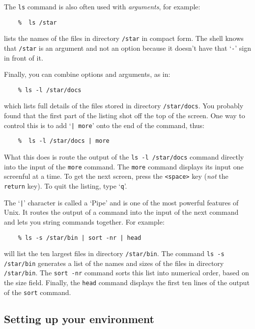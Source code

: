 \documentclass[twoside,11pt]{article}
\begin{document}
The {\tt ls} command is also often used with {\em arguments}, for example:
\begin{verbatim}
    %  ls /star
\end{verbatim}
lists the names of the files in directory {\tt /star} in compact form.
The shell knows that {\tt /star} is an argument and not an option because it
doesn't have that `{\tt -}' sign in front of it.

Finally, you can combine options and arguments, as in:
\begin{verbatim}
    % ls -l /star/docs
\end{verbatim}
which lists full details of the files stored in directory {\tt /star/docs}.
You probably found that the first part of the listing shot off the top of the
screen.
One way to control this is to add `{\tt | more}' onto the end of the command,
thus:
\begin{verbatim}
    %  ls -l /star/docs | more
\end{verbatim}
What this does is route the output of the {\tt ls -l /star/docs} command
directly into the input of the {\tt more} command.
The {\tt more} command displays its input one screenful at a time.
To get the next screen, press the {\tt <space>} key ({\em not}\/ the
{\tt return} key).
To quit the listing, type `{\tt q}'.

The `{\tt |}' character is called a `Pipe' and is one of the most powerful
features of Unix.
It routes the output of a command into the input of the next command and lets
you string commands together.
For example:
\begin{verbatim}
    % ls -s /star/bin | sort -nr | head
\end{verbatim}
will list the ten largest files in directory {\tt /star/bin}.
The command {\tt ls -s /star/bin} generates a list of the names and sizes of the
files in directory {\tt /star/bin}.
The {\tt sort -nr} command sorts this list into numerical order, based on
the size field.
Finally, the {\tt head} command displays the first ten lines of the output of
the {\tt sort} command.

\subsection{Setting up your environment\label{suye}}
\end{document}
